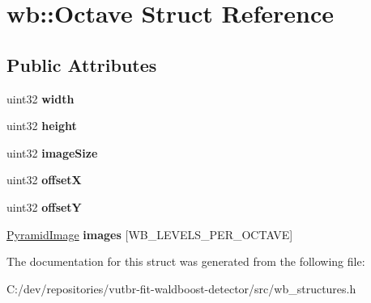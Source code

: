 \hypertarget{structwb_1_1_octave}{}\section{wb\+:\+:Octave Struct Reference}
\label{structwb_1_1_octave}
\subsection*{Public Attributes}
\begin{DoxyCompactItemize}
\item 
\hypertarget{structwb_1_1_octave_a1ffea70dec3ab98d123ef6cea4d5c1c1}{}uint32 {\bfseries width}\label{structwb_1_1_octave_a1ffea70dec3ab98d123ef6cea4d5c1c1}

\item 
\hypertarget{structwb_1_1_octave_afdf8eb3202f56b86fe92b92b79ffd13c}{}uint32 {\bfseries height}\label{structwb_1_1_octave_afdf8eb3202f56b86fe92b92b79ffd13c}

\item 
\hypertarget{structwb_1_1_octave_a5c0aad9e446ee99099854068048aa6da}{}uint32 {\bfseries image\+Size}\label{structwb_1_1_octave_a5c0aad9e446ee99099854068048aa6da}

\item 
\hypertarget{structwb_1_1_octave_ad8466f10c765c3163444f079b67df23b}{}uint32 {\bfseries offset\+X}\label{structwb_1_1_octave_ad8466f10c765c3163444f079b67df23b}

\item 
\hypertarget{structwb_1_1_octave_ac1f9bd1002592a7fa44a207bbd6e55a5}{}uint32 {\bfseries offset\+Y}\label{structwb_1_1_octave_ac1f9bd1002592a7fa44a207bbd6e55a5}

\item 
\hypertarget{structwb_1_1_octave_a0f31438d2b1ebe3c85f6acb3b008b00b}{}\hyperlink{structwb_1_1_pyramid_image}{Pyramid\+Image} {\bfseries images} \mbox{[}W\+B\+\_\+\+L\+E\+V\+E\+L\+S\+\_\+\+P\+E\+R\+\_\+\+O\+C\+T\+A\+V\+E\mbox{]}\label{structwb_1_1_octave_a0f31438d2b1ebe3c85f6acb3b008b00b}

\end{DoxyCompactItemize}


The documentation for this struct was generated from the following file\+:\begin{DoxyCompactItemize}
\item 
C\+:/dev/repositories/vutbr-\/fit-\/waldboost-\/detector/src/wb\+\_\+structures.\+h\end{DoxyCompactItemize}
